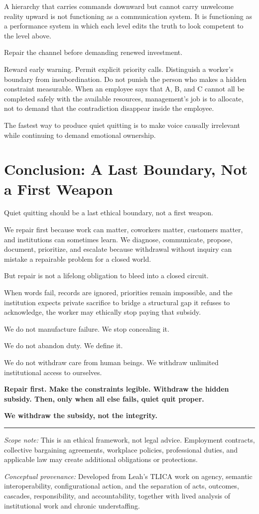 \documentclass[11pt,oneside]{article}
\begin{document}
A hierarchy that carries commands downward but cannot carry unwelcome reality upward is not functioning as a communication system. It is functioning as a performance system in which each level edits the truth to look competent to the level above.

Repair the channel before demanding renewed investment.

Reward early warning. Permit explicit priority calls. Distinguish a worker's boundary from insubordination. Do not punish the person who makes a hidden constraint measurable. When an employee says that A, B, and C cannot all be completed safely with the available resources, management's job is to allocate, not to demand that the contradiction disappear inside the employee.

The fastest way to produce quiet quitting is to make voice causally irrelevant while continuing to demand emotional ownership.

\section{Conclusion: A Last Boundary, Not a First Weapon}\label{conclusion-a-last-boundary-not-a-first-weapon}

Quiet quitting should be a last ethical boundary, not a first weapon.

We repair first because work can matter, coworkers matter, customers matter, and institutions can sometimes learn. We diagnose, communicate, propose, document, prioritize, and escalate because withdrawal without inquiry can mistake a repairable problem for a closed world.

But repair is not a lifelong obligation to bleed into a closed circuit.

When words fail, records are ignored, priorities remain impossible, and the institution expects private sacrifice to bridge a structural gap it refuses to acknowledge, the worker may ethically stop paying that subsidy.

We do not manufacture failure. We stop concealing it.

We do not abandon duty. We define it.

We do not withdraw care from human beings. We withdraw unlimited institutional access to ourselves.

\textbf{Repair first. Make the constraints legible. Withdraw the hidden subsidy. Then, only when all else fails, quiet quit proper.}

\textbf{We withdraw the subsidy, not the integrity.}

\begin{center}\rule{0.5\linewidth}{0.5pt}\end{center}

\emph{Scope note:} This is an ethical framework, not legal advice. Employment contracts, collective bargaining agreements, workplace policies, professional duties, and applicable law may create additional obligations or protections.

\emph{Conceptual provenance:} Developed from Leah's TLICA work on agency, semantic interoperability, configurational action, and the separation of acts, outcomes, cascades, responsibility, and accountability, together with lived analysis of institutional work and chronic understaffing.
\end{document}
